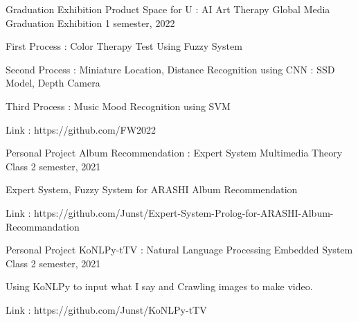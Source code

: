 

\begin{cventries}

  \cventry
    {Graduation Exhibition Product} %
    {Space for U : AI Art Therapy} %
    {Global Media Graduation Exhibition} %
    {1 semester, 2022} %
    {
      \begin{cvitems} %
        \item {First Process : Color Therapy Test Using Fuzzy System }
        \item {Second Process : Miniature Location, Distance Recognition using CNN : SSD Model, Depth Camera}
        \item {Third Process : Music Mood Recognition using SVM }
        \item {Link : https://github.com/FW2022 }
      \end{cvitems}
    }

  \cventry
    {Personal Project} %
    {Album Recommendation : Expert System} %
    {Multimedia Theory Class} %
    {2 semester, 2021} %
    {
      \begin{cvitems} %
        \item {Expert System, Fuzzy System for ARASHI Album Recommendation}
        \item {Link : https://github.com/Junst/Expert-System-Prolog-for-ARASHI-Album-Recommandation }
      \end{cvitems}
    }
    
  \cventry
    {Personal Project} %
    {KoNLPy-tTV : Natural Language Processing} %
    {Embedded System Class} %
    {2 semester, 2021} %
    {
      \begin{cvitems} %
        \item {Using KoNLPy to input what I say and Crawling images to make video.}
        \item {Link : https://github.com/Junst/KoNLPy-tTV }
      \end{cvitems}
    }
    

\end{cventries}
